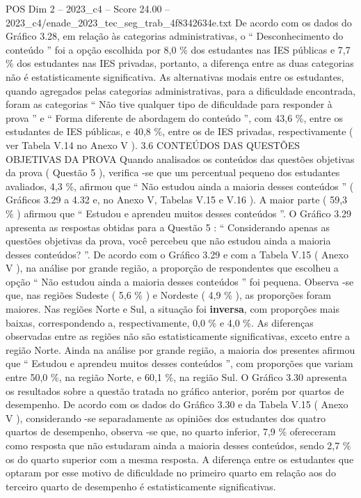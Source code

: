 \begin{textsample}{POS Dim 2 – 2023\_c4 – Score 24.00 – 2023\_c4/enade\_2023\_tec\_seg\_trab\_4f8342634e.txt}
De acordo com os dados do Gráfico 3.28, em relação às categorias administrativas, o “ Desconhecimento do conteúdo ” foi a opção escolhida por 8,0 \% dos estudantes nas IES públicas e 7,7 \% dos estudantes nas IES privadas, portanto, a diferença entre as duas categorias não é estatisticamente significativa.
As alternativas modais entre os estudantes, quando agregados pelas categorias administrativas, para a dificuldade encontrada, foram as categorias “ Não tive qualquer tipo de dificuldade para responder à prova ” e “ Forma diferente de abordagem do conteúdo ”, com 43,6 \%, entre os estudantes de IES públicas, e 40,8 \%, entre os de IES privadas, respectivamente ( ver Tabela V.14 no Anexo V ). 3.6 CONTEÚDOS DAS QUESTÕES OBJETIVAS DA PROVA Quando analisados os conteúdos das questões objetivas da prova ( Questão 5 ), verifica -se que um percentual pequeno dos estudantes avaliados, 4,3 \%, afirmou que “ Não estudou ainda a maioria desses conteúdos ” ( Gráficos 3.29 a 4.32 e, no Anexo V, Tabelas V.15 e V.16 ).
A maior parte ( 59,3 \% ) afirmou que “ Estudou e aprendeu muitos desses conteúdos ”.
O Gráfico 3.29 apresenta as respostas obtidas para a Questão 5 : “ Considerando apenas as questões objetivas da prova, você percebeu que não estudou ainda a maioria desses conteúdos? ”.
De acordo com o Gráfico 3.29 e com a Tabela V.15 ( Anexo V ), na análise por grande região, a proporção de respondentes que escolheu a opção “ Não estudou ainda a maioria desses conteúdos ” foi pequena.
Observa -se que, nas regiões Sudeste ( 5,6 \% ) e Nordeste ( 4,9 \% ), as proporções foram maiores.
Nas regiões Norte e Sul, a situação foi \textbf{inversa}, com proporções mais baixas, correspondendo a, respectivamente, 0,0 \% e 4,0 \%.
As diferenças observadas entre as regiões não são estatisticamente significativas, exceto entre a região Norte.
Ainda na análise por grande região, a maioria dos presentes afirmou que “ Estudou e aprendeu muitos desses conteúdos ”, com proporções que variam entre 50,0 \%, na região Norte, e 60,1 \%, na região Sul.
O Gráfico 3.30 apresenta os resultados sobre a questão tratada no gráfico anterior, porém por quartos de desempenho.
De acordo com os dados do Gráfico 3.30 e da Tabela V.15 ( Anexo V ), considerando -se separadamente as opiniões dos estudantes dos quatro quartos de desempenho, observa -se que, no quarto inferior, 7,9 \% ofereceram como resposta que não estudaram ainda a maioria desses conteúdos, sendo 2,7 \% os do quarto superior com a mesma resposta.
A diferença entre os estudantes que optaram por esse motivo de dificuldade no primeiro quarto em relação aos do terceiro quarto de desempenho é estatisticamente significativas.

\end{textsample}
